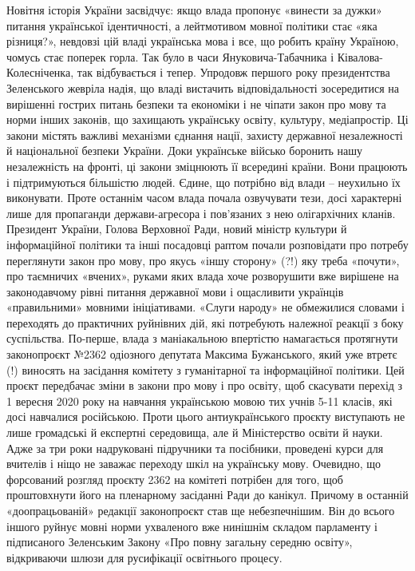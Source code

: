 Новітня історія України засвідчує: якщо влада пропонує «винести за дужки» питання української ідентичності, а лейтмотивом мовної політики стає «яка різниця?», невдовзі цій владі українська мова і все, що робить країну Україною, чомусь стає поперек горла.
Так було в часи Януковича-Табачника і Ківалова-Колесніченка, так відбувається і тепер.
Упродовж першого року президентства Зеленського жевріла надія, що владі вистачить відповідальності зосередитися на вирішенні гострих питань безпеки та економіки і не чіпати закон про мову та норми інших законів, що захищають українську освіту, культуру, медіапростір.
Ці закони містять важливі механізми єднання нації, захисту державної незалежності й національної безпеки України. Доки українське військо боронить нашу незалежність на фронті, ці закони зміцнюють її всередині країни. Вони працюють і підтримуються більшістю людей.
Єдине, що потрібно від влади – неухильно їх виконувати.
Проте останнім часом влада почала озвучувати тези, досі характерні лише для пропаганди держави-агресора і пов’язаних з нею олігархічних кланів. Президент України, Голова Верховної Ради, новий міністр культури й інформаційної політики та інші посадовці раптом почали розповідати про потребу переглянути закон про мову, про якусь «іншу сторону» (?!) яку треба «почути», про таємничих «вчених», руками яких влада хоче розворушити вже вирішене на законодавчому рівні питання державної мови і ощасливити українців «правильними» мовними ініціативами.
«Слуги народу» не обмежилися словами і переходять до практичних руйнівних дій, які потребують належної реакції з боку суспільства.
По-перше, влада з маніакальною впертістю намагається протягнути законопроєкт №2362 одіозного депутата Максима Бужанського, який уже втретє (!) виносять на засідання комітету з гуманітарної та інформаційної політики. Цей проєкт передбачає зміни в закони про мову і про освіту, щоб скасувати перехід з 1 вересня 2020 року на навчання українською мовою тих учнів 5-11 класів, які досі навчалися російською.
Проти цього антиукраїнського проєкту виступають не лише громадські й експертні середовища, але й Міністерство освіти й науки. Адже за три роки надруковані підручники та посібники, проведені курси для вчителів і ніщо не заважає переходу шкіл на українську мову. Очевидно, що форсований розгляд проєкту 2362 на комітеті потрібен для того, щоб проштовхнути його на пленарному засіданні Ради до канікул.
Причому в останній «доопрацьованій» редакції законопроєкт став ще небезпечнішим. Він до всього іншого руйнує мовні норми ухваленого вже нинішнім складом парламенту і підписаного Зеленським Закону «Про повну загальну середню освіту», відкриваючи шлюзи для русифікації освітнього процесу.
